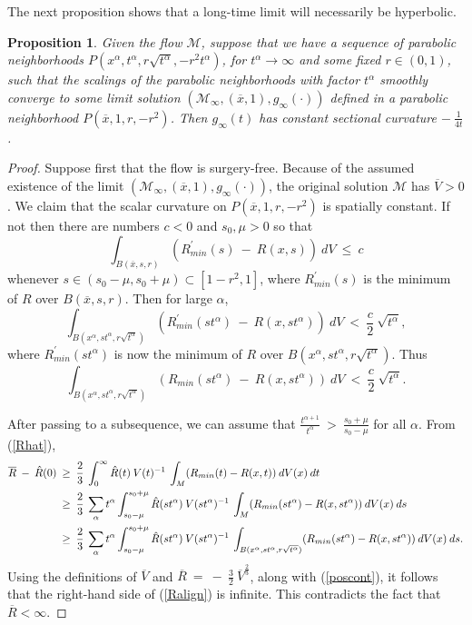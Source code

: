 \documentclass[12pt]{amsart}
\newcommand{\al}{\alpha}
\newcommand{\M}{{\mathcal M}}
\numberwithin{equation}{section}
\theoremstyle{plain}
\newtheorem{proposition}[equation]{Proposition}
\theoremstyle{definition}
\theoremstyle{remark}
\begin{document}
The next proposition shows that a long-time limit will
necessarily be hyperbolic.
\begin{proposition} \label{propII.7.1}
Given the flow $\M$,
suppose that we have a sequence of parabolic neighborhoods
$P(x^\al, t^\al, r \sqrt{t^\al}, - r^2 t^\al)$, for
$t^\al \rightarrow \infty$ and some fixed $r \in (0,1)$, such that
the scalings of the parabolic neighborhoods with factor
$t^\al$ smoothly converge to some limit
solution $(\M_\infty, (\overline{x}, 1), g_\infty(\cdot))$
defined in a parabolic neighborhood
$P(\overline{x}, 1, r, -r^2)$. Then $g_\infty(t)$ has
constant sectional curvature $- \: \frac{1}{4t}$.
\end{proposition}
\begin{proof}
Suppose first that the flow is surgery-free. Because of the assumed existence of the limit
$(\M_\infty, (\overline{x}, 1), g_\infty(\cdot))$, the
original solution $\M$ has $\overline{V} > 0$.
We claim that the scalar curvature
on $P(\overline{x}, 1, r, -r^2)$ is spatially constant.
If not then there are numbers $c<0$ and $s_0, \mu > 0$ so that
\begin{equation}
\int_{B(\overline{x}, {s}, r)} (R^\prime_{min}({s}) 
\: - \: R(x, {s})) \: dV \: \le \: c
\end{equation}
whenever ${s} \in (s_0 - \mu, s_0 + \mu) \subset [1-r^2, 1]$, 
where $R^\prime_{min}({s})$ 
is the minimum of $R$ over
$B(\overline{x}, {s}, r)$. Then for large $\alpha$,
\begin{equation}
\int_{B(x^\alpha, {s} t^\alpha, r \sqrt{t^\alpha})} 
(R^\prime_{min}({s} t^\alpha) 
\: - \: R(x, {s} t^\alpha)) \: dV \: < \: \frac{c}{2}
\: \sqrt{t^\alpha}, 
\end{equation}
where $R^\prime_{min}({s} t^\alpha)$ is now the minimum of $R$ over
$B(x^\alpha, {s} t^\alpha, r \sqrt{t^\alpha})$.
Thus
\begin{equation} \label{poscont}
\int_{B(x^\alpha, {s} t^\alpha, r \sqrt{t^\alpha})} 
(R_{min}({s} t^\alpha) \: - \: R(x, {s} t^\alpha)) \: 
dV \: < \: \frac{c}{2}
\: \sqrt{t^\alpha}. 
\end{equation}

After passing to a subsequence, we can assume that
$\frac{t^{\alpha + 1}}{t^\al} \: > \: \frac{s_0 + \mu}{s_0 - \mu}$ for
all $\al$. From (\ref{Rhat}),
\begin{align} \label{Ralign}
\overline{R} \: - \: \hat{R}(0) \: & \ge \: 
\frac23 \: \int_0^\infty \hat{R}(t) \: V(t)^{-1} \:
\int_M (R_{min}(t) - R(x,t)) \: dV(x) \: dt \\
& \ge \:
\frac23 \: \sum_{\al} t^\al
\int_{s_0- \mu}^{s_0 + \mu} \hat{R}(s t^\al) \: V(s t^\al)^{-1} \:
\int_M (R_{min}(s t^\al) - R(x,s t^\al)) \: dV(x) \: ds \notag \\
& \ge \:
\frac23 \: \sum_{\al} t^\al
\int_{s_0- \mu}^{s_0 + \mu} \hat{R}(s t^\al) \: V(s t^\al)^{-1} \:
\int_{B(x^\alpha, {s} t^\alpha, r \sqrt{t^\alpha})}
(R_{min}(s t^\al) - R(x,s t^\al)) \: dV(x) \: ds. \notag
\end{align}
Using the definitions of $\overline{V}$ and $\overline{R} \: = \: 
- \: \frac32 \: \overline{V}^{\frac23}$, along with 
(\ref{poscont}), it follows that
the right-hand side of (\ref{Ralign}) is infinite.
This contradicts the fact that $\overline{R} < \infty$.


\end{proof}
\end{document}
